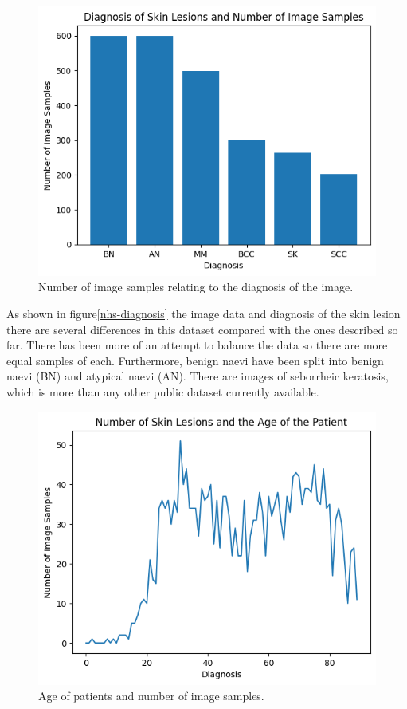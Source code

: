 \begin{figure}
	\centering
	\includegraphics[scale=0.75]{images/nhs/nhs-diagnosis.png}
	\caption{Number of image samples relating to the diagnosis of the image.}
\end{figure}\label{nhs-diagnosis}

As shown in figure\ref{nhs-diagnosis} the image data and diagnosis of the skin lesion there are several differences in this dataset compared with the ones described so far. There has been more of an attempt to balance the data so there are more equal samples of each. Furthermore, benign naevi have been split into benign naevi (BN) and atypical naevi (AN). There are images of seborrheic keratosis, which is more than any other public dataset currently available.

\begin{figure}
	\centering
	\includegraphics[scale=0.75]{images/nhs/nhs-age.png}
	\caption{Age of patients and number of image samples.}
\end{figure}\label{nhs-age}

